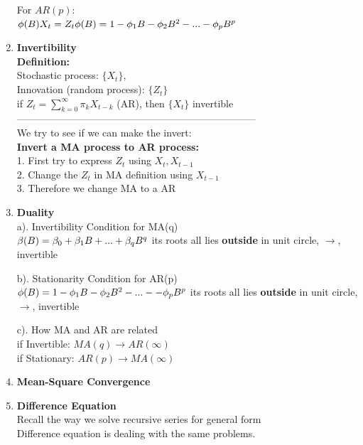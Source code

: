 \documentclass[10pt,landscape]{article}
\begin{document}
\begin{multicols}{3}
\begin{enumerate}
  		For $AR(p)$:\\
  		$
  		\phi(B)X_t = Z_t\\
  		\phi(B) = 1-\phi_1B - \phi_2B^2 - ... - \phi_pB^p
  		$
  		
  \item \textbf{Invertibility}\\
  		\textbf{Definition:}\\
  		Stochastic process: $\{X_t\}$, \\
  		Innovation (random process): $\{Z_t\}$\\
  		if $Z_t = \sum_{k=0}^{\infty} \pi_kX_{t-k}$ (AR), then $\{X_t\}$ invertible\\
  		------------------------------------------------------------------------\\
  		We try to see if we can make the invert:\\
  		\textbf{Invert a MA process to AR process:}\\
  		1. First try to express $Z_t$ using $X_t, X_{t-1}$\\
  		2. Change the $Z_t$ in MA definition using $X_{t-1}$\\
  		3. Therefore we change MA to a AR
  		
  \item \textbf{Duality}\\
  		a). Invertibility Condition for MA(q)\\
  		$
  		\beta(B) = \beta_0 + \beta_1B + ... + \beta_qB^q\\
  		$
  		its roots all lies \textbf{outside}  in unit circle, $\rightarrow$, invertible
  		
  		b). Stationarity Condition for AR(p)\\
  		$
  		\phi(B) = 1-\phi_1B -\phi_2B^2 - ... - -\phi_pB^p\\
  		$
  		its roots all lies \textbf{outside}  in unit circle, $\rightarrow$, invertible
  		
  		c). How MA and AR are related\\
  		if Invertible: $MA(q) \longrightarrow AR(\infty)$\\
  		if Stationary: $AR(p) \longrightarrow MA(\infty)$
  		
  \item \textbf{Mean-Square Convergence}
  \item \textbf{Difference Equation}\\
  		Recall the way we solve recursive series for general form\\
  		Difference equation is dealing with the same problems.\\
  		

\end{enumerate}
\end{multicols}
\end{document}
